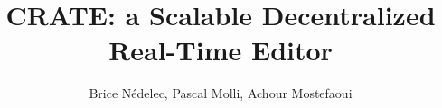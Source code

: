 \documentclass{sig-alternate}
\begin{document}
\title{CRATE: a Scalable Decentralized Real-Time Editor}

\author{
     \alignauthor Brice N\'edelec, Pascal Molli, Achour Mostefaoui\\
     \\
     \\
}

\maketitle














\raggedright


% 
% 
\end{document}
